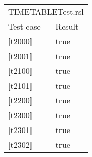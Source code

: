 \documentclass[a4]{article}
\begin{document}
\begin{table}[h]
    \begin{tabular}{ll}
        \multicolumn{2}{l}{TIMETABLETest.rsl}   \\
        \multicolumn{1}{l|}{Test case}  & Result \\ \hline 
        \multicolumn{1}{l|}{{[}t2000{]}} & true  \\
        \multicolumn{1}{l|}{{[}t2001{]}} & true  \\
        \multicolumn{1}{l|}{{[}t2100{]}} & true  \\
        \multicolumn{1}{l|}{{[}t2101{]}} & true  \\
        \multicolumn{1}{l|}{{[}t2200{]}} & true  \\
        \multicolumn{1}{l|}{{[}t2300{]}} & true  \\
        \multicolumn{1}{l|}{{[}t2301{]}} & true  \\
        \multicolumn{1}{l|}{{[}t2302{]}} & true 
    \end{tabular}
\end{table}
\end{document}
